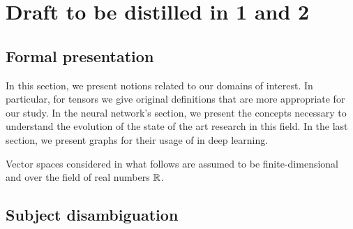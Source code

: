 \setcounter{chapter}{-1}
\chapter{Draft to be distilled in 1 and 2}

\minitoc
\newpage

\section{Formal presentation}

In this section, we present notions related to our domains of interest. In particular, for tensors we give original definitions that are more appropriate for our study. In the neural network's section, we present the concepts necessary to understand the evolution of the state of the art research in this field. In the last section, we present graphs for their usage of in deep learning.

Vector spaces considered in what follows are assumed to be finite-dimensional and over the field of real numbers $\mathbb{R}$.


\newpage

\newpage

\newpage

\section{Subject disambiguation}


\newpage